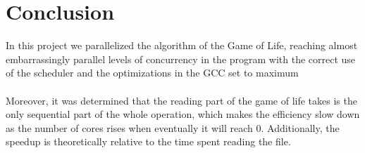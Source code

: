 \documentclass[11pt, a4paper]{article}
\begin{document}
	\section{Conclusion}
	In this project we parallelized the algorithm of the Game of Life, reaching almost embarrassingly parallel levels of concurrency in the program with the correct use of the scheduler and the optimizations in the GCC set to maximum\\
\\
Moreover, it was determined that the reading part of the game of life takes is the only sequential part of the whole operation, which makes the efficiency slow down as the number of cores rises when eventually it will reach 0. Additionally, the speedup is theoretically relative to the time spent reading the file.\\
\\

	
\end{document}
